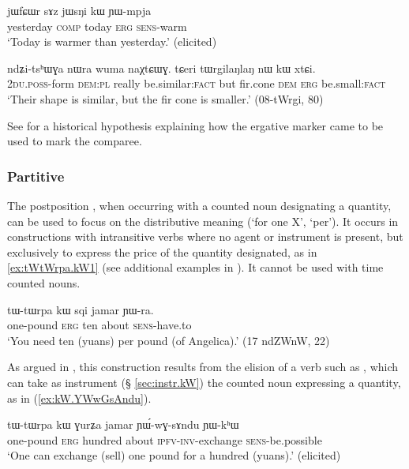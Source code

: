 \begin{exe}
\ex \label{ex:comparative2}
\gll  jɯfɕɯr sɤz  jɯsŋi kɯ  ɲɯ-mpja \\
yesterday \textsc{comp} today \textsc{erg} \textsc{sens}-warm \\
\glt `Today is warmer than yesterday.' (elicited)
\end{exe}
\begin{exe}
\ex \label{ex:nW.kW.xtCi}
\gll ndʑi-tsʰɯɣa nɯra wuma naχtɕɯɣ. tɕeri tɯrgilaŋlaŋ nɯ kɯ xtɕi. \\
\textsc{2du}.\textsc{poss}-form \textsc{dem}:\textsc{pl} really be.similar:\textsc{fact} but fir.cone \textsc{dem} \textsc{erg} be.small:\textsc{fact} \\
\glt  `Their shape is similar, but the fir cone is smaller.' (08-tWrgi, 80)
\end{exe}

See \citet{jacques16comparative} for a historical hypothesis explaining how the ergative marker came to be used to mark the comparee. 

\subsubsection{Partitive} \label{sec:partitive.kW}
The postposition , when occurring with a counted noun designating a quantity, can be used to focus on the distributive meaning (`for one X', `per'). It occurs in constructions with intransitive verbs where no agent or instrument is present, but exclusively to express the price of the quantity designated, as in  \ref{ex:tWtWrpa.kW1} (see additional examples in \citealt[5-6]{jacques16comparative}). It cannot be used with time counted nouns.

 \begin{exe} 
\ex \label{ex:tWtWrpa.kW1}
\gll  tɯ-tɯrpa kɯ sqi jamar ɲɯ-ra. \\
one-pound \textsc{erg} ten about \textsc{sens}-have.to \\
\glt `You need ten (yuans) per pound (of Angelica).' (17 ndZWnW, 22)
\end{exe}  

As argued in \citet[23]{jacques16comparative}, this construction results from the elision of a verb such as , which can take as instrument (§ \ref{sec:instr.kW}) the counted noun expressing a quantity, as in (\ref{ex:kW.YWwGsAndu}).


  \begin{exe}
\ex \label{ex:kW.YWwGsAndu}
\gll tɯ-tɯrpa kɯ ɣurʑa jamar ɲɯ́-wɣ-sɤndu ɲɯ-kʰɯ \\
one-pound \textsc{erg} hundred about \textsc{ipfv-inv}-exchange \textsc{sens}-be.possible \\
\glt `One can exchange (sell) one pound for a hundred (yuans).' (elicited)
\end{exe}


